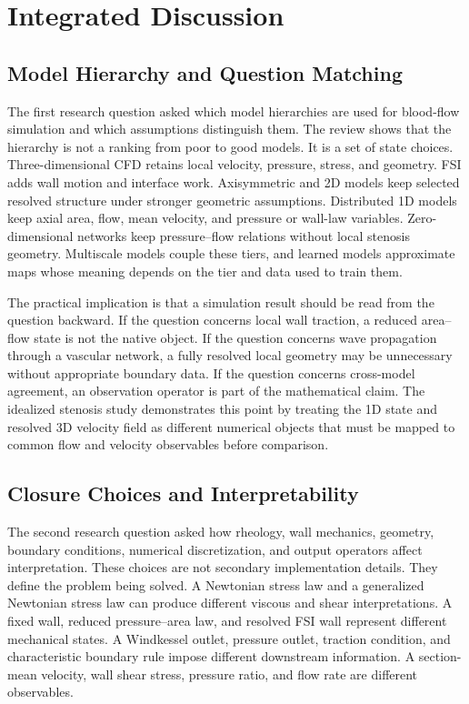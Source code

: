 \section{Integrated Discussion}
\label{sec:discussion}

\subsection{Model Hierarchy and Question Matching}
\label{subsec:discussion-model-hierarchy-question-matching}

The first research question asked which model hierarchies are used for
blood-flow simulation and which assumptions distinguish them. The review shows
that the hierarchy is not a ranking from poor to good models. It is a set of
state choices. Three-dimensional CFD retains local velocity, pressure, stress,
and geometry. FSI adds wall motion and interface work. Axisymmetric and 2D
models keep selected resolved structure under stronger geometric assumptions.
Distributed 1D models keep axial area, flow, mean velocity, and pressure or
wall-law variables. Zero-dimensional networks keep pressure--flow relations
without local stenosis geometry. Multiscale models couple these tiers, and
learned models approximate maps whose meaning depends on the tier and data used
to train them.

The practical implication is that a simulation result should be read from the
question backward. If the question concerns local wall traction, a reduced
area--flow state is not the native object. If the question concerns wave
propagation through a vascular network, a fully resolved local geometry may be
unnecessary without appropriate boundary data. If the question concerns
cross-model agreement, an observation operator is part of the mathematical
claim. The idealized stenosis study demonstrates this point by treating the 1D
state and resolved 3D velocity field as different numerical objects that must be
mapped to common flow and velocity observables before comparison.

\subsection{Closure Choices and Interpretability}
\label{subsec:discussion-closures-interpretability}

The second research question asked how rheology, wall mechanics, geometry,
boundary conditions, numerical discretization, and output operators affect
interpretation. These choices are not secondary implementation details. They
define the problem being solved. A Newtonian stress law and a generalized
Newtonian stress law can produce different viscous and shear interpretations. A
fixed wall, reduced pressure--area law, and resolved FSI wall represent
different mechanical states. A Windkessel outlet, pressure outlet, traction
condition, and characteristic boundary rule impose different downstream
information. A section-mean velocity, wall shear stress, pressure ratio, and
flow rate are different observables.

